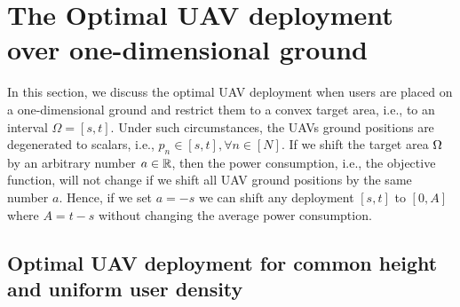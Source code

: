 \documentclass[smallabstract,smallcaptions]{dccpaper}
\newcommand{\philippstart}{\color{black}}
\newcommand{\philippend}{\color{black}}
\begin{document}
\fi %

\section{The Optimal UAV deployment over one-dimensional ground}

In this section, we discuss the optimal UAV deployment when users are placed on a one-dimensional ground and restrict
them to a convex target area, i.e., to an interval $\Omega = [s,t]$.  Under such circumstances, the UAVs ground
positions are degenerated to scalars, i.e., $p_n\in[s, t], \forall n\in[N]$.  \philippstart If we shift the
target area $\Omega$ by an arbitrary number $a\in{\ensuremath{\mathbb R}}$, then the power consumption, i.e., the objective function, will not
change if we shift all UAV ground positions by the same number $a$. Hence, if we set $a=-s$ we can shift any deployment
$[s,t]$ to $[0,A]$ where $A=t-s$ without changing the average power consumption.   \philippend

\subsection{Optimal UAV deployment for common height and uniform user density}
\end{document}
